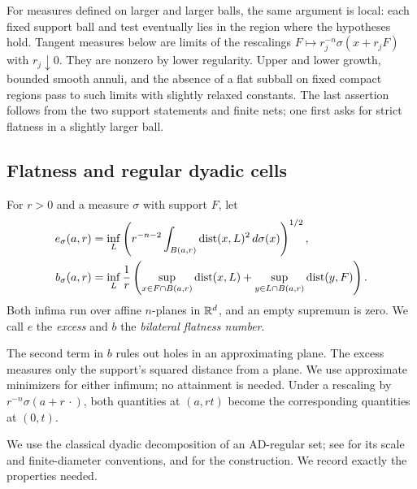 For measures defined on larger and larger balls, the same argument is
local: each fixed support ball and test eventually lies in the region
where the hypotheses hold. Tangent measures below are limits of the
rescalings $F\mapsto r_j^{-n}\sigma(x+r_jF)$ with $r_j\downarrow0$.
They are nonzero by lower regularity. Upper and lower growth, bounded
smooth annuli, and the absence of a flat subball on fixed compact
regions pass to such limits with slightly relaxed constants. The last
assertion follows from the two support statements and finite nets;
one first asks for strict flatness in a slightly larger ball.

\subsection{Flatness and regular dyadic cells}

\begin{definition}\label{def:flatness}
For $r>0$ and a measure $\sigma$ with support $F$, let
\begin{align*}
 e_\sigma(a,r)
 &=\inf_L\left(r^{-n-2}\int_{B(a,r)}\operatorname{dist}(x,L)^2\,d\sigma(x)\right)^{1/2},\\
 b_\sigma(a,r)
 &=\inf_L\frac1r\left(
   \sup_{x\in F\cap B(a,r)}\operatorname{dist}(x,L)
   +\sup_{y\in L\cap B(a,r)}\operatorname{dist}(y,F)\right).
\end{align*}
Both infima run over affine $n$-planes in $\mathbb R^d$, and an empty
supremum is zero. We call $e$ the \emph{excess} and $b$ the
\emph{bilateral flatness number}.
\end{definition}

The second term in $b$ rules out holes in an approximating plane.
The excess measures only the support's squared distance from a plane.
We use approximate minimizers for either infimum; no attainment is
needed. Under a rescaling by $r^{-n}\sigma(a+r\,\cdot)$, both
quantities at $(a,rt)$ become the corresponding quantities at $(0,t)$.

We use the classical dyadic decomposition of an AD-regular set;
see \cite[Section~4, p.~12]{AzzamMourgoglouVilla2023} for its scale and
finite-diameter conventions, and \cite{DavidSemmes1993} for the
construction. We record exactly the properties needed.

